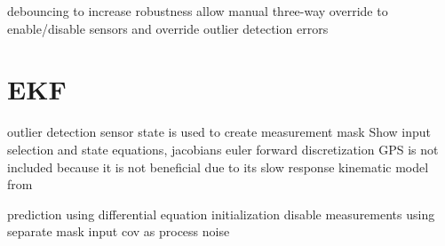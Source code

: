 debouncing to increase robustness
allow manual three-way override to enable/disable sensors and override outlier detection errors

\section{EKF}
outlier detection sensor state is used to create measurement mask
Show input selection and state equations, jacobians
euler forward discretization
GPS is not included because it is not beneficial due to its slow response
kinematic model from~\cite[p.~156]{AlexanderWischnewski.2019}


prediction using differential equation
initialization
disable measurements using separate mask
input cov as process noise
